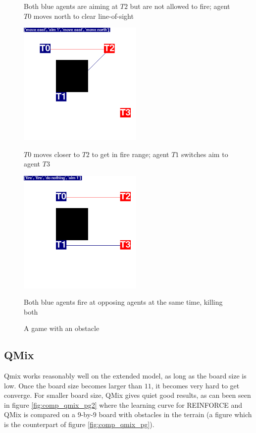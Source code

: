 \begin{figure}
\begin{minipage}{.45\textwidth}
  \caption*{Both blue agents are aiming at $T2$ but are not allowed to fire; agent $T0$ moves north to clear line-of-sight}
\end{minipage}%
\begin{minipage}{.1\textwidth}
\centering
  \caption*{ }
\end{minipage}%
\begin{minipage}{.45\textwidth}
  \centering
  \includegraphics[width=6cm]{images/iteration/screenshot04.png}
    \caption*{$T0$ moves closer to $T2$ to get in fire range; agent $T1$ switches aim to agent $T3$}
\end{minipage}
\begin{minipage}{.5\textwidth}
  \centering
  \includegraphics[width=6cm]{images/iteration/screenshot05.png}
    \caption*{Both blue agents fire at opposing agents at the same time, killing both}
\end{minipage}%
\begin{minipage}{.5\textwidth}
  \centering
\end{minipage}
\caption{A game with an obstacle}
\label{fig:simple_tactic02}
\end{figure}

\subsection{QMix}
Qmix works reasonably well on the extended model, as long as the board size is low. Once the board size becomes larger than $11$, it becomes very hard to get converge. For smaller board size, QMix gives quiet good results, as can been seen in figure \ref{fig:comp_qmix_pg2} where the learning curve for REINFORCE and QMix is compared on a 9-by-9 board with obstacles in the terrain (a figure which is the counterpart of figure \ref{fig:comp_qmix_pg}).

